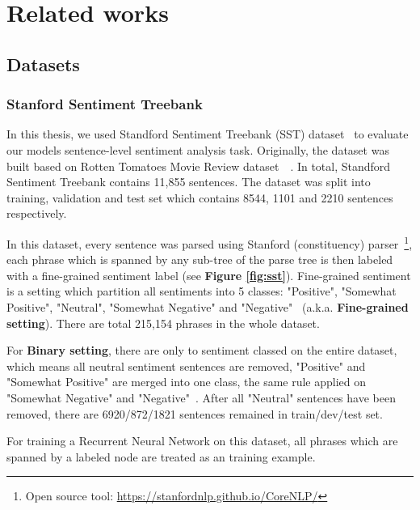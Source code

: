 \hypertarget{chap:related}{\chapter{Related works}}
\label{chap:related-work}
\section{Datasets}\label{sec:dataset}
\subsection{Stanford Sentiment Treebank} \label{sec:sst}
In this thesis, we used Standford Sentiment Treebank (SST) dataset~\cite{socher2013recursive} to evaluate our models sentence-level sentiment analysis task.
Originally, the dataset was built based on Rotten Tomatoes Movie Review dataset~\cite{Rotten-Tomato}~\cite{socher2013recursive}.
In total, Standford Sentiment Treebank contains 11,855 sentences.
The dataset was split into training, validation and test set which contains 8544, 1101 and 2210 sentences respectively.


In this dataset, every sentence was parsed using Stanford (constituency) parser~\cite{socher2013recursive}\footnote{Open source tool: \url{https://stanfordnlp.github.io/CoreNLP/}}, each phrase which is spanned by any sub-tree of the parse tree is then labeled with  a fine-grained sentiment label (see \textbf{Figure \ref{fig:sst}}).
Fine-grained sentiment is a setting which partition all sentiments into 5 classes: "Positive", "Somewhat Positive", "Neutral", "Somewhat Negative" and "Negative"~\cite{socher2013recursive} (a.k.a. \textbf{Fine-grained setting}).
There are total 215,154 phrases in the whole dataset.

For \textbf{Binary setting}, there are only to sentiment classed on the entire dataset, which means all neutral sentiment sentences are removed, "Positive" and "Somewhat Positive" are merged into one class, the same rule applied on "Somewhat Negative" and "Negative"~\cite{socher2013recursive}.
After all "Neutral" sentences have been removed, there are 6920/872/1821 sentences remained in train/dev/test set.

For training a Recurrent Neural Network on this dataset, all phrases which are spanned by a labeled node are treated as an training example. 


